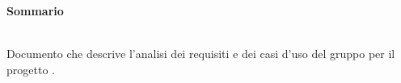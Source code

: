 \noindent\begin{Large}\textbf{Sommario}\end{Large}\\
\noindent
Documento che descrive l'analisi dei requisiti e dei casi d'uso del gruppo \gruppo{} per il progetto \progetto{}.